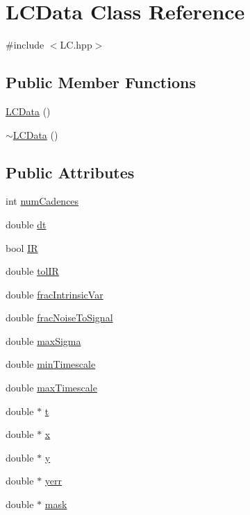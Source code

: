 \hypertarget{class_l_c_data}{\section{L\-C\-Data Class Reference}
\label{class_l_c_data}
}


{\ttfamily \#include $<$L\-C.\-hpp$>$}

\subsection*{Public Member Functions}
\begin{DoxyCompactItemize}
\item 
\hyperlink{class_l_c_data_ada9bc58c533a6644fd7f0ed87aa68825}{L\-C\-Data} ()
\item 
\hyperlink{class_l_c_data_a39aa2b1418c755c1fd2cdc8a2dd4b3a9}{$\sim$\-L\-C\-Data} ()
\end{DoxyCompactItemize}
\subsection*{Public Attributes}
\begin{DoxyCompactItemize}
\item 
int \hyperlink{class_l_c_data_a137abcea32e2d608a6b7687e583c18fe}{num\-Cadences}
\item 
double \hyperlink{class_l_c_data_ad53e36c32c3fa363ef1f3d79e51f0bbf}{dt}
\item 
bool \hyperlink{class_l_c_data_a42a0e899dba3e9b6fd7ae8fe3f577f22}{I\-R}
\item 
double \hyperlink{class_l_c_data_a7abd754c3405413fd35b44f8da911b2a}{tol\-I\-R}
\item 
double \hyperlink{class_l_c_data_aba6416bcecc2ac9cee661b6afcb6f5c5}{frac\-Intrinsic\-Var}
\item 
double \hyperlink{class_l_c_data_ae3b5e95e4eca1131359ca714343e59c4}{frac\-Noise\-To\-Signal}
\item 
double \hyperlink{class_l_c_data_a349cd84383e8bfda50d203b84ef5d527}{max\-Sigma}
\item 
double \hyperlink{class_l_c_data_a71baee20f31c307d57b6087939a18a2d}{min\-Timescale}
\item 
double \hyperlink{class_l_c_data_a3373ecbb559da5356ed987e378b80a08}{max\-Timescale}
\item 
double $\ast$ \hyperlink{class_l_c_data_a65e9d543136280889767d3411763c7cd}{t}
\item 
double $\ast$ \hyperlink{class_l_c_data_a617ec6819e34f2c3b92af6236604ae22}{x}
\item 
double $\ast$ \hyperlink{class_l_c_data_a48a0e8c8bb6cdaf00a7b6bac28fb5751}{y}
\item 
double $\ast$ \hyperlink{class_l_c_data_a4bed19db03704655b351259402b317e0}{yerr}
\item 
double $\ast$ \hyperlink{class_l_c_data_adc13a3afaa98f9b6f9eebce2aea57a36}{mask}
\end{DoxyCompactItemize}


